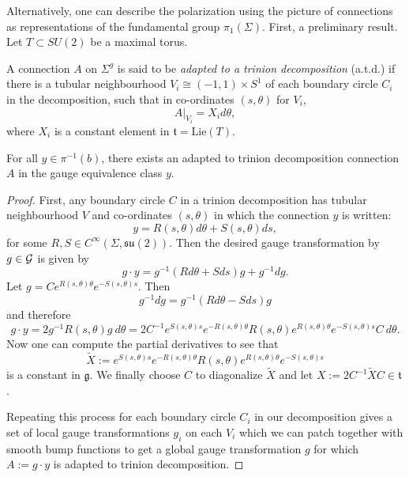 	Alternatively, one can describe the polarization using the picture of connections as representations of the fundamental group $\pi_1(\Sigma)$. First, a preliminary result. Let $T\subset SU(2)$ be a maximal torus.
	\begin{definition}
		A connection $A$ on $\Sigma^g$ is said to be \emph{adapted to a trinion decomposition} (a.t.d.) if there is a tubular neighbourhood $V_i \cong (-1,1)\times S^1$ of each boundary circle $C_i$ in the decomposition, such that in co-ordinates $(s,\theta)$ for $V_i$,
		\begin{equation}
			A|_{V_i} = X_i d\theta, 
		\end{equation}
		where $X_i$ is a constant element in $\mathfrak{t} = \text{Lie}(T)$.
	\end{definition}
	\begin{theorem}
		\label{t:atd-thm}
		For all $y\in \pi^{-1}(b)$, there exists an adapted to trinion decomposition connection $A$ in the gauge equivalence class $y$.
	\end{theorem}
	\begin{proof}
	First, any boundary circle $C$ in a trinion decomposition has tubular neighbourhood $V$ and co-ordinates $(s,\theta)$ in which the connection $y$ is written:
	\begin{equation}
		y = R(s,\theta)d\theta + S(s,\theta)ds,
	\end{equation}
	for some $R,S \in C^\infty(\Sigma, \mathfrak{su}(2))$. Then the desired gauge transformation by $g\in \mathcal{G}$ is given by
	\begin{equation}
		g\cdot y = g^{-1}(Rd\theta + Sds)g + g^{-1}dg.
	\end{equation}	
	Let $g=Ce^{R(s,\theta)\theta}e^{-S(s,\theta)s}$. Then 
	\begin{equation}
		g^{-1}dg = g^{-1}(Rd\theta-Sds)g
	\end{equation}
	and therefore
	\begin{equation}
		g\cdot y = 2g^{-1}R(s,\theta)g~d\theta = 2C^{-1}e^{S(s,\theta)s}e^{-R(s,\theta)\theta} R(s,\theta)e^{R(s,\theta)\theta}e^{-S(s,\theta)s}C~d\theta.
	\end{equation}
	Now one can compute the partial derivatives to see that
	\begin{equation}
		\tilde{X} := e^{S(s,\theta)s}e^{-R(s,\theta)\theta} R(s,\theta)e^{R(s,\theta)\theta}e^{-S(s,\theta)s}
	\end{equation} 
	is a constant in $\mathfrak{g}$. We finally choose $C$ to diagonalize $\tilde{X}$ and let $X:= 2C^{-1}\tilde{X}C \in \mathfrak{t}$.
	
	Repeating this process for each boundary circle $C_i$ in our decomposition gives a set of local gauge transformations $g_i$ on each $V_i$ which we can patch together with smooth bump functions to get a global gauge transformation $g$ for which $A:=g\cdot y$ is adapted to trinion decomposition.
	\end{proof}
	
